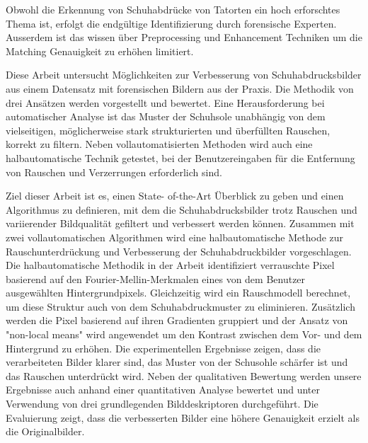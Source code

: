 \documentclass[draft,final]{vutinfth} %
\begin{document}
\begin{kurzfassung}
\par
Obwohl die Erkennung von Schuhabdrücke von Tatorten ein hoch erforschtes Thema ist, erfolgt die endgültige Identifizierung  durch forensische Experten.
Ausserdem ist das wissen über Preprocessing und Enhancement Techniken um die Matching Genauigkeit zu erhöhen limitiert.
\par
Diese Arbeit untersucht Möglichkeiten zur Verbesserung von Schuhabdrucksbilder aus einem Datensatz mit forensischen Bildern aus der Praxis. 
Die Methodik von drei Ansätzen werden vorgestellt und bewertet. 
Eine Herausforderung bei automatischer Analyse ist das Muster der Schuhsole unabhängig von dem vielseitigen, möglicherweise stark strukturierten und überfüllten Rauschen, korrekt zu filtern.
Neben vollautomatisierten Methoden wird auch eine halbautomatische Technik getestet, bei der Benutzereingaben für die Entfernung von Rauschen und Verzerrungen erforderlich sind. 
\par
Ziel dieser Arbeit ist es, einen State- of-the-Art Überblick zu geben und einen Algorithmus zu definieren, mit dem die Schuhabdrucksbilder trotz Rauschen und variierender Bildqualität gefiltert und verbessert werden können.
Zusammen mit zwei vollautomatischen Algorithmen wird eine halbautomatische Methode zur Rauschunterdrückung und Verbesserung der Schuhabdruckbilder vorgeschlagen. 
Die halbautomatische Methodik in der Arbeit identifiziert verrauschte Pixel basierend auf den Fourier-Mellin-Merkmalen eines von dem Benutzer ausgewählten Hintergrundpixels. 
Gleichzeitig wird ein Rauschmodell berechnet, um diese Struktur auch von dem Schuhabdruckmuster zu eliminieren. 
Zusätzlich werden die Pixel basierend auf ihren Gradienten gruppiert und der Ansatz von "non-local means" wird angewendet um den Kontrast zwischen dem Vor- und dem Hintergrund zu erhöhen.
Die experimentellen Ergebnisse zeigen, dass die verarbeiteten Bilder klarer sind, das Muster von der Schusohle schärfer ist und das Rauschen unterdrückt wird. 
Neben der qualitativen Bewertung werden unsere Ergebnisse auch anhand einer quantitativen Analyse bewertet und unter Verwendung von drei grundlegenden Bilddeskriptoren durchgeführt.
Die Evaluierung zeigt, dass die verbesserten Bilder eine höhere Genauigkeit erzielt als die Originalbilder.

\end{kurzfassung}
\end{document}
